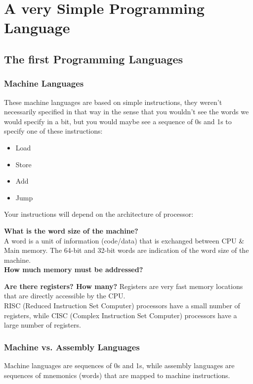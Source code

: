 \chapter{A very Simple Programming Language}

\section{The first Programming Languages}
     \subsection{Machine Languages}
     These machine languages are based on simple instructions, they weren't necessarily specified in that way in the sense that you wouldn't see the words we would specify in a bit, but you would maybe see a sequence of 0s and 1s to specify one of these instructions:
     \begin{itemize}
        \item Load
        \item Store
        \item Add
        \item Jump
     \end{itemize}

     Your instructions will depend on the architecture of processor:

     \textbf{What is the word size of the machine?}\\
     A word is a unit of information (code/data) that is exchanged between CPU \& Main memory.
     The 64-bit and 32-bit words are indication of the word size of the machine.\\
     \textbf{How much memory must be addressed?}

     \textbf{Are there registers? How many?}
     Registers are very fast memory locations that are directly accessible by the CPU.\\
     RISC (Reduced Instruction Set Computer) processors have a small number of registers, while CISC (Complex Instruction Set Computer) processors have a large number of registers.\\

     \subsection{Machine vs. Assembly Languages}
     Machine languages are sequences of 0s and 1s, while assembly languages are sequences of mnemonics (words) that are mapped to machine instructions.\\


